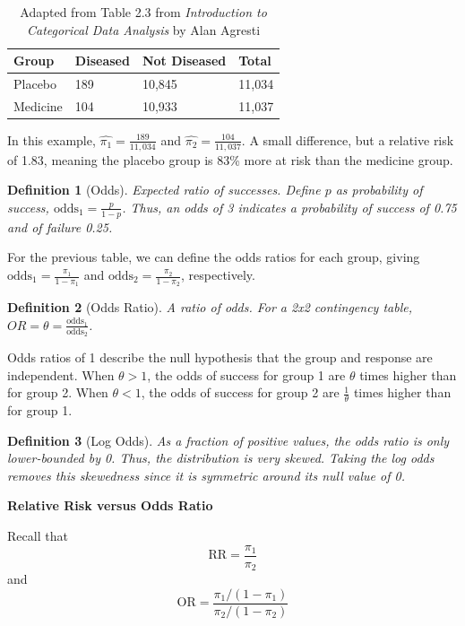 \documentclass{tufte-handout}
\theoremstyle{noparens}
\newtheorem*{define}{Definition}
\begin{document}
\begin{table}
\centering
\begin{tabular}{llll}
\toprule
Group & Diseased & Not Diseased & Total\\
\midrule
Placebo & 189 & 10,845 & 11,034\\
Medicine & 104 & 10,933 & 11,037\\
\bottomrule
\end{tabular}
\caption{Adapted from Table 2.3 from \emph{Introduction to Categorical Data Analysis} by Alan Agresti}
\end{table}

In this example, $\hat{\pi_1} = \frac{189}{11,034}$ and $\hat{\pi_2} = \frac{104}{11,037}$. A small difference, but a relative risk of 1.83, meaning the placebo group is 83\% more at risk than the medicine group.

\begin{define}[Odds]
Expected ratio of successes. Define $p$ as probability of success, $\text{odds}_1 = \frac{p}{1-p}$. Thus, an odds of 3 indicates a probability of success of 0.75 and of failure 0.25.
\end{define}

For the previous table, we can define the odds ratios for each group, giving $\text{odds}_1 = \frac{\pi_1}{1-\pi_1}$ and $\text{odds}_2 = \frac{\pi_2}{1-\pi_2}$, respectively. 

\begin{define}[Odds Ratio]
A ratio of odds. For a 2x2 contingency table, $OR = \theta = \frac{\text{odds}_1}{\text{odds}_2}$.
\end{define}

Odds ratios of 1 describe the null hypothesis that the group and response are independent. When $\theta > 1$, the odds of success for group 1 are $\theta$ times higher than for group 2. When $\theta < 1$, the odds of success for group 2 are $\frac{1}{\theta}$ times higher than for group 1.

\begin{define}[Log Odds]
As a fraction of positive values, the odds ratio is only lower-bounded by 0. Thus, the distribution is very skewed. Taking the log odds removes this skewedness since it is symmetric around its null value of 0.
\end{define}

\textbf{Relative Risk versus Odds Ratio}

Recall that \[ \text{RR} = \frac{\pi_1}{\pi_2} \] and \[ \text{OR} = \frac{\pi_1 / (1-\pi_1)}{\pi_2 / (1-\pi_2)} \]
\end{document}
